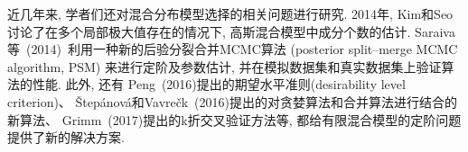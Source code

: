\documentclass[a4paper,12pt,openany,oneside,utf-8]{ctexbook}
\begin{document}

近几年来, 学者们还对混合分布模型选择的相关问题进行研究. 2014年, Kim和Seo讨论了在多个局部极大值存在的情况下, 高斯混合模型中成分个数的估计. Saraiva等~(2014)~利用一种新的后验分裂合并MCMC算法 (posterior split–merge MCMC algorithm, PSM) 来进行定阶及参数估计, 并在模拟数据集和真实数据集上验证算法的性能. 此外, 还有
Peng~(2016)提出的期望水平准则(desirability level criterion)、%
Štepánová和Vavrečk~(2016)提出的对贪婪算法和合并算法进行结合的新算法、%
Grimm~(2017)提出的k折交叉验证方法等, 都给有限混合模型的定阶问题提供了新的解决方案.%
\end{document}
